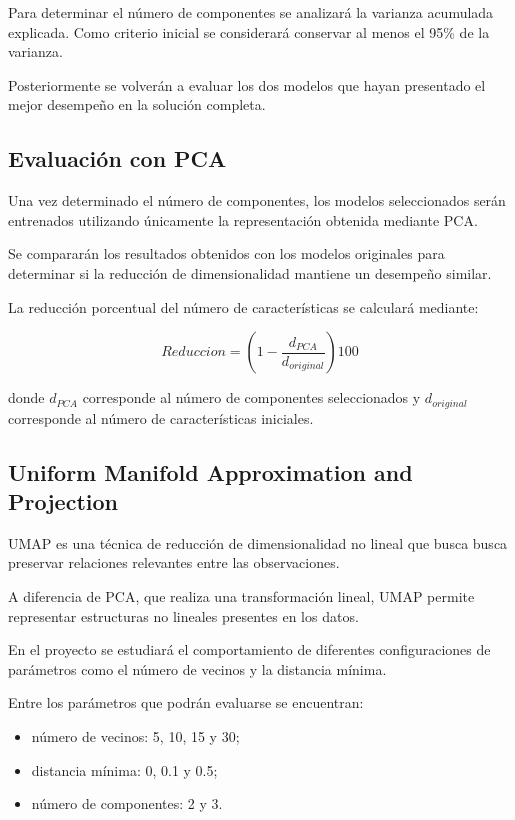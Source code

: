 \documentclass[conference]{IEEEtran}
\begin{document}
Para determinar el número de componentes se analizará la varianza acumulada explicada. Como criterio inicial se considerará conservar al menos el 95\% de la varianza.

Posteriormente se volverán a evaluar los dos modelos que hayan presentado el mejor desempeño en la solución completa.


\subsection{Evaluación con PCA}

Una vez determinado el número de componentes, los modelos seleccionados serán entrenados utilizando únicamente la representación obtenida mediante PCA.

Se compararán los resultados obtenidos con los modelos originales para determinar si la reducción de dimensionalidad mantiene un desempeño similar.

La reducción porcentual del número de características se calculará mediante:

\begin{equation}
Reduccion=
\left(
1-\frac{d_{PCA}}{d_{original}}
\right)100
\end{equation}

donde $d_{PCA}$ corresponde al número de componentes seleccionados y $d_{original}$ corresponde al número de características iniciales.


\subsection{Uniform Manifold Approximation and Projection}

UMAP es una técnica de reducción de dimensionalidad no lineal que busca busca preservar relaciones relevantes entre las observaciones.

A diferencia de PCA, que realiza una transformación lineal, UMAP permite representar estructuras no lineales presentes en los datos.

En el proyecto se estudiará el comportamiento de diferentes configuraciones de parámetros como el número de vecinos y la distancia mínima.

Entre los parámetros que podrán evaluarse se encuentran:

\begin{itemize}
    \item número de vecinos: 5, 10, 15 y 30;
    \item distancia mínima: 0, 0.1 y 0.5;
    \item número de componentes: 2 y 3.
\end{itemize}
\end{document}
